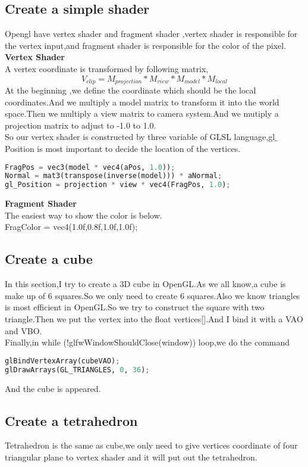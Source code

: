 \documentclass[acmtog]{acmart}
\begin{document}
\subsection{Create a simple shader}
Opengl have vertex shader and fragment shader ,vertex shader is responsible for the vertex input,and fragment shader is responsible for the color of the pixel.\\
\textbf{Vertex Shader}\\
A vertex coordinate is transformed by following matrix,
$$V_{clip}=M_{projection}*M_{view}*M_{model}*M_{local}$$
At the beginning ,we define the coordinate which should be the local coordinates.And we multiply a model matrix to transform it into the world space.Then we multiply a view matrix to camera system.And we mutiply a projection matrix to adjust to -1.0 to 1.0.\\
So our vertex shader is constructed by three variable of GLSL language,gl$\_$Position is most important to decide the location of the vertices.\\ 


\begin{lstlisting}[language=Python]
FragPos = vec3(model * vec4(aPos, 1.0));
Normal = mat3(transpose(inverse(model))) * aNormal;  
gl_Position = projection * view * vec4(FragPos, 1.0);
\end{lstlisting}
\textbf{Fragment Shader}\\
The easiest way to show the color is below.\\
FragColor = vec4(1.0f,0.8f,1.0f,1.0f);
\subsection{Create a cube}
In this section,I try to create a 3D cube in OpenGL.As we all know,a cube is make up of 6 squares.So we only need to create 6 squares.Also we know triangles is most efficient in OpenGL.So we try to construct the square with two triangle.Then we put the vertex into the float vertices[].And I bind it with a VAO and VBO.\\
Finally,in while (!glfwWindowShouldClose(window)) loop,we do the command 
\begin{lstlisting}[language=Python]
glBindVertexArray(cubeVAO);  
glDrawArrays(GL_TRIANGLES, 0, 36); 
\end{lstlisting} 
And the cube is appeared.
\subsection{Create a tetrahedron}
Tetrahedron is the same as cube,we only need to give vertices coordinate of four triangular plane to vertex shader and it will put out the tetrahedron.
\end{document}
